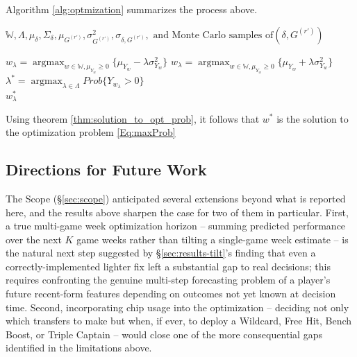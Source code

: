 \documentclass[12pt,oneside,a4paper]{book}
\theoremstyle{definition}
\theoremstyle{remark}
\DeclareMathOperator*{\argmax}{argmax}
\begin{document}
					Algorithm \ref{alg:optmization} summarizes the process above.


					\begin{algorithm}
						\caption{Optimization for the Problem }
						\label{alg:optmization}
						\begin{algorithmic}[1]
							\Require $\mathbb{W}, \Lambda, \mu_\delta, \Sigma_{\delta}, \mu_{G^(r')}, \sigma^2_{G^(r')}, \sigma_{\delta, G^{(r')}}, \text{ and Monte Carlo samples of} (\delta, G^{(r')})$

							\ForAll{ $\lambda \in  \Lambda$}
							\State $w_\lambda = \argmax_{w \in \mathbb{W}, \mu_{Y_w} \ge 0 } \{\mu_{Y_w} - \lambda\sigma^2_{Y_w}\}$
							\EndFor
							\Else
							\ForAll{ $\lambda \in  \Lambda$}
							\State $w_\lambda = \argmax_{w \in \mathbb{W}, \mu_{Y_w} \ge 0 } \{\mu_{Y_w} + \lambda\sigma^2_{Y_w}\}$
							\EndFor
							\EndIf
							\State  $\lambda^* = \argmax_{ \lambda \in \Lambda } Prob\{Y_{w_\lambda} > 0 \}$\\
							\Return $w_\lambda^*$
						\end{algorithmic}
					\end{algorithm}
			Using theorem \ref{thm:solution_to_opt_prob}, it follows that $w^*$ is the solution to the optimization problem \ref{Eq:maxProb}


			\subsection{Directions for Future Work}
				The Scope (\S\ref{sec:scope}) anticipated several extensions beyond what is reported here, and the results above sharpen the case for two of them in particular. First, a true multi-game week optimization horizon -- summing predicted performance over the next $K$ game weeks rather than tilting a single-game week estimate -- is the natural next step suggested by \S\ref{sec:results-tilt}'s finding that even a correctly-implemented lighter fix left a substantial gap to real decisions; this requires confronting the genuine multi-step forecasting problem of a player's future recent-form features depending on outcomes not yet known at decision time. Second, incorporating chip usage into the optimization -- deciding not only which transfers to make but when, if ever, to deploy a Wildcard, Free Hit, Bench Boost, or Triple Captain -- would close one of the more consequential gaps identified in the limitations above.
\end{document}
